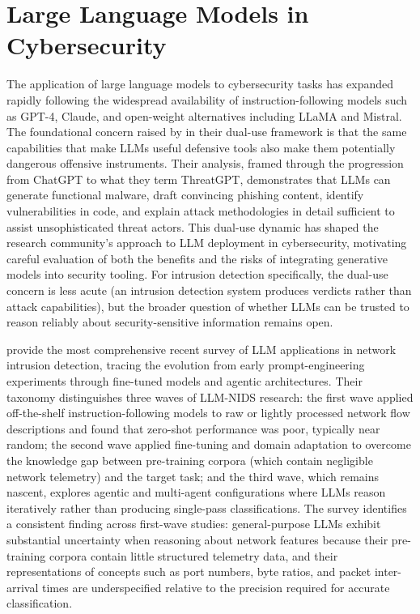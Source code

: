 \section{Large Language Models in Cybersecurity}
\label{sec:llm-cybersecurity}

The application of large language models to cybersecurity tasks has expanded rapidly following the widespread availability of instruction-following models such as GPT-4, Claude, and open-weight alternatives including LLaMA and Mistral. The foundational concern raised by \textcite{Gupta2023} in their dual-use framework is that the same capabilities that make LLMs useful defensive tools also make them potentially dangerous offensive instruments. Their analysis, framed through the progression from ChatGPT to what they term ThreatGPT, demonstrates that LLMs can generate functional malware, draft convincing phishing content, identify vulnerabilities in code, and explain attack methodologies in detail sufficient to assist unsophisticated threat actors. This dual-use dynamic has shaped the research community's approach to LLM deployment in cybersecurity, motivating careful evaluation of both the benefits and the risks of integrating generative models into security tooling. For intrusion detection specifically, the dual-use concern is less acute (an intrusion detection system produces verdicts rather than attack capabilities), but the broader question of whether LLMs can be trusted to reason reliably about security-sensitive information remains open.

\textcite{FengSakurai2025} provide the most comprehensive recent survey of LLM applications in network intrusion detection, tracing the evolution from early prompt-engineering experiments through fine-tuned models and agentic architectures. Their taxonomy distinguishes three waves of LLM-NIDS research: the first wave applied off-the-shelf instruction-following models to raw or lightly processed network flow descriptions and found that zero-shot performance was poor, typically near random; the second wave applied fine-tuning and domain adaptation to overcome the knowledge gap between pre-training corpora (which contain negligible network telemetry) and the target task; and the third wave, which remains nascent, explores agentic and multi-agent configurations where LLMs reason iteratively rather than producing single-pass classifications. The survey identifies a consistent finding across first-wave studies: general-purpose LLMs exhibit substantial uncertainty when reasoning about network features because their pre-training corpora contain little structured telemetry data, and their representations of concepts such as port numbers, byte ratios, and packet inter-arrival times are underspecified relative to the precision required for accurate classification.

